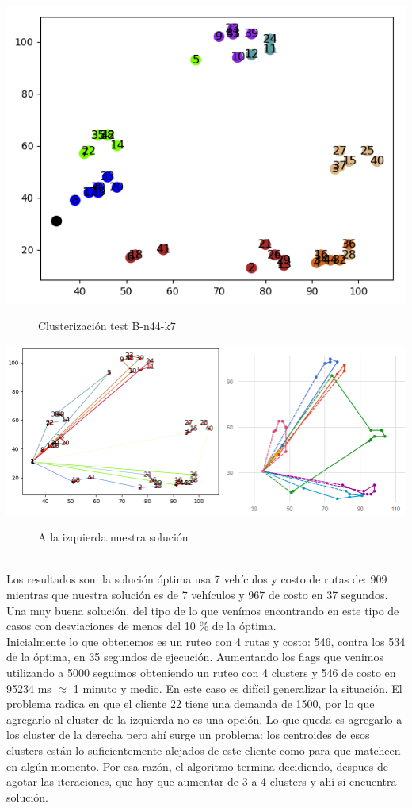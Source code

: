 \documentclass[11pt,a4paper]{article}
\begin{document}
\bigskip
\includegraphics[scale=.45]{graficos/B-n44-k7/cluster.png}
\begin{figure}[!h]
\caption{Clusterización test B-n44-k7}
\end{figure}
\bigskip
\includegraphics[scale=.45]{graficos/B-n44-k7/caminos.png}
\begin{figure}[!h]
\caption{A la izquierda nuestra solución}
\end{figure}
\\Los resultados son: la solución óptima usa 7 vehículos y costo de rutas de: 909 mientras que nuestra solución es de 7 vehículos y 967 de costo en 37 segundos. Una muy buena solución, del tipo de lo que venímos encontrando en este tipo de casos con desviaciones de menos del 10 \% de la óptima.\\
Inicialmente lo que obtenemos es un ruteo con 4 rutas y costo: 546, contra los 534 de la óptima, en 35 segundos de ejecución. Aumentando los flags que venimos utilizando a 5000 seguimos obteniendo un ruteo con 4 clusters y 546 de costo en 95234 ms $\approx$ 1 minuto y medio. En este caso es difícil generalizar la situación. El problema radica en que el cliente 22 tiene una demanda de 1500, por lo que agregarlo al cluster de la izquierda no es una opción. Lo que queda es agregarlo a los cluster de la derecha pero ahí surge un problema: los centroides de esos clusters están lo suficientemente alejados de este cliente como para que matcheen en algún momento. Por esa razón, el algoritmo termina decidiendo, despues de agotar las iteraciones, que hay que aumentar de 3 a 4 clusters y ahí si encuentra solución. \\
\end{document}
